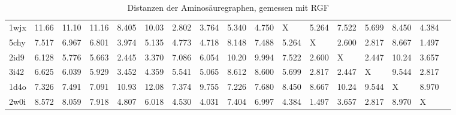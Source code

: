 \documentclass{report}
\begin{document}
\begin{table}
{\begin{tabular}{l l l l l l l l l l l l l l l l l}
1wjx & 11.66 & 11.10 & 11.16 & 8.405 & 10.03 & \cellcolor{fGreen!100}2.802 & \cellcolor{fGreen!75}3.764 & 5.340 & \cellcolor{fGreen!25}4.750 &   X   & 5.264 & 7.522 & 5.699 & 8.450 & \cellcolor{fGreen!50}4.384 &  \\
5chy & 7.517 & 6.967 & 6.801 & \cellcolor{fGreen!25}3.974 & 5.135 & 4.773 & 4.718 & 8.148 & 7.488 & 5.264 &   X   & \cellcolor{fGreen!75}2.600 & \cellcolor{fGreen!50}2.817 & 8.667 & \cellcolor{fGreen!100}1.497 &  \\
2id9 & 6.128 & 5.776 & 5.663 & \cellcolor{fGreen!100}2.445 & \cellcolor{fGreen!25}3.370 & 7.086 & 6.054 & 10.20 & 9.994 & 7.522 & \cellcolor{fGreen!50}2.600 &   X   & \cellcolor{fGreen!75}2.447 & 10.24 & 3.657 &  \\
3i42 & 6.625 & 6.039 & 5.929 & \cellcolor{fGreen!25}3.452 & 4.359 & 5.541 & 5.065 & 8.612 & 8.600 & 5.699 & \cellcolor{fGreen!75}2.817 & \cellcolor{fGreen!100}2.447 &   X   & 9.544 & \cellcolor{fGreen!50}2.817 &  \\
1d4o & \cellcolor{fGreen!50}7.326 & 7.491 & \cellcolor{fGreen!100}7.091 & 10.93 & 12.08 & \cellcolor{fGreen!25}7.374 & 9.755 & \cellcolor{fGreen!75}7.226 & 7.680 & 8.450 & 8.667 & 10.24 & 9.544 &   X   & 8.970 &  \\
2w0i & 8.572 & 8.059 & 7.918 & 4.807 & 6.018 & 4.530 & \cellcolor{fGreen!25}4.031 & 7.404 & 6.997 & 4.384 & \cellcolor{fGreen!100}1.497 & \cellcolor{fGreen!50}3.657 & \cellcolor{fGreen!75}2.817 & 8.970 &   X   &  \\



\end{tabular}}
\caption{Distanzen der Aminos\"auregraphen, gemessen mit RGF}
\end{table}
\end{document}
